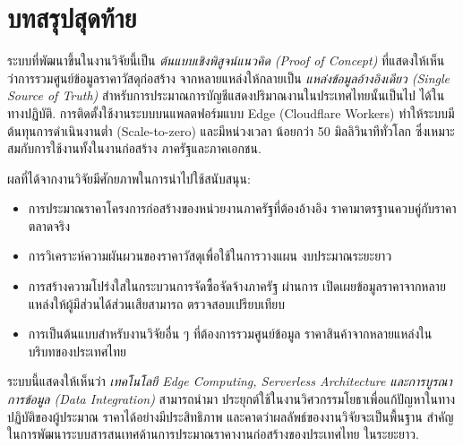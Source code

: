 \section{บทสรุปสุดท้าย}
\label{sec:final}

ระบบที่พัฒนาขึ้นในงานวิจัยนี้เป็น \emph{ต้นแบบเชิงพิสูจน์แนวคิด
(Proof of Concept)} ที่แสดงให้เห็นว่าการรวมศูนย์ข้อมูลราคาวัสดุก่อสร้าง
จากหลายแหล่งให้กลายเป็น \emph{แหล่งข้อมูลอ้างอิงเดียว (Single Source
of Truth)} สำหรับการประมาณการบัญชีแสดงปริมาณงานในประเทศไทยนั้นเป็นไป
ได้ในทางปฏิบัติ. การติดตั้งใช้งานระบบบนแพลตฟอร์มแบบ Edge (Cloudflare
Workers) ทำให้ระบบมีต้นทุนการดำเนินงานต่ำ (Scale-to-zero) และมีหน่วงเวลา
น้อยกว่า 50 มิลลิวินาทีทั่วโลก ซึ่งเหมาะสมกับการใช้งานทั้งในงานก่อสร้าง
ภาครัฐและภาคเอกชน.

ผลที่ได้จากงานวิจัยมีศักยภาพในการนำไปใช้สนับสนุน:
\begin{itemize}[leftmargin=2em,itemsep=0.1em]
  \item การประมาณราคาโครงการก่อสร้างของหน่วยงานภาครัฐที่ต้องอ้างอิง
        ราคามาตรฐานควบคู่กับราคาตลาดจริง
  \item การวิเคราะห์ความผันผวนของราคาวัสดุเพื่อใช้ในการวางแผน
        งบประมาณระยะยาว
  \item การสร้างความโปร่งใสในกระบวนการจัดซื้อจัดจ้างภาครัฐ ผ่านการ
        เปิดเผยข้อมูลราคาจากหลายแหล่งให้ผู้มีส่วนได้ส่วนเสียสามารถ
        ตรวจสอบเปรียบเทียบ
  \item การเป็นต้นแบบสำหรับงานวิจัยอื่น ๆ ที่ต้องการรวมศูนย์ข้อมูล
        ราคาสินค้าจากหลายแหล่งในบริบทของประเทศไทย
\end{itemize}

ระบบนี้แสดงให้เห็นว่า \emph{เทคโนโลยี Edge Computing, Serverless
Architecture และการบูรณาการข้อมูล (Data Integration)} สามารถนำมา
ประยุกต์ใช้ในงานวิศวกรรมโยธาเพื่อแก้ปัญหาในทางปฏิบัติของผู้ประมาณ
ราคาได้อย่างมีประสิทธิภาพ และคาดว่าผลลัพธ์ของงานวิจัยจะเป็นพื้นฐาน
สำคัญในการพัฒนาระบบสารสนเทศด้านการประมาณราคางานก่อสร้างของประเทศไทย
ในระยะยาว.
